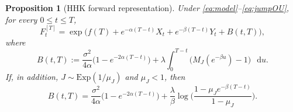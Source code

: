 \documentclass[10pt,a4paper,reqno]{amsart}
\newcommand{\<}{\langle}
\renewcommand{\>}{\rangle}
\newtheorem{proposition}[theorem]{Proposition}
\theoremstyle{example}
\newcommand*\D{\mathop{}\!\mathrm{d}}
\begin{document}
\begin{proposition}[HHK forward representation]
\label{prop:hhk_forward}
Under \eqref{eq:model}--\eqref{eq:jumpOU}, for every $0 \le t \le T$,
\begin{equation}
\label{eq:hhk_forward_formula}
F_t^{[T]}
=
\exp\!\Big(
f(T)
+
e^{-\alpha(T-t)} X_t
+
e^{-\beta(T-t)} Y_t
+
B(t,T)
\Big),
\end{equation}
where
\begin{equation}
\label{eq:hhk_B}
B(t,T)
:=
\frac{\sigma^2}{4\alpha}\Big(1-e^{-2\alpha(T-t)}\Big)
+
\lambda \int_0^{T-t}
\Big(
M_J(e^{-\beta u})-1
\Big)\,\D u.
\end{equation}
If, in addition, $J \sim \mathrm{Exp}(1/\mu_J)$ and $\mu_J<1$, then
\begin{equation}
\label{eq:hhk_B_exp}
B(t,T)
=
\frac{\sigma^2}{4\alpha}\Big(1-e^{-2\alpha(T-t)}\Big)
+
\frac{\lambda}{\beta}
\log\!\Bigg(
\frac{1-\mu_J e^{-\beta(T-t)}}{1-\mu_J}
\Bigg).
\end{equation}
\end{proposition}
\end{document}
